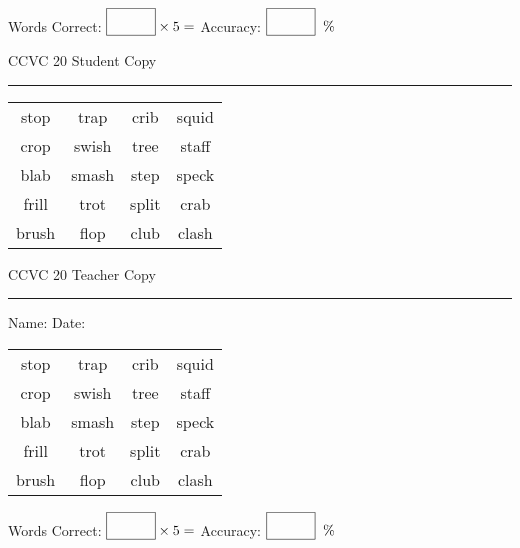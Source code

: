 \documentclass{memoir}
\begin{document}
\small

Words Correct: $\fbox{\phantom{\huge 100}} \times 5 = $ Accuracy: $\fbox{\phantom{\huge 100}}\;\; \%$ 

\vfill

\newpage



\footnotesize \noindent
CCVC 20 \hfill Student Copy
\smallskip
\hrule

\Large

\setlength{\tabcolsep}{14pt}
\def\arraystretch{3}

{\selectfont


\begin{vplace}[0.5]
\begin{center}
\begin{tabular}{cccc}
stop & trap & crib & squid \\
crop & swish & tree & staff            \\
blab             & smash & step & speck \\
frill & trot & split & crab        \\
brush & flop & club & clash            \\
\end{tabular}
\end{center}
\end{vplace}

}

\newpage

\footnotesize \noindent
CCVC 20 \hfill Teacher Copy
\smallskip
\hrule

\small

\vfill

\noindent
Name: \underline{\hspace{1.75in}} \hfill Date: \underline{\hspace{1in}}

\Large

{\selectfont


\begin{vplace}[0.5]
\begin{center}
\begin{tabular}{cccc}
stop & trap & crib & squid \\
crop & swish & tree & staff            \\
blab             & smash & step & speck \\
frill & trot & split & crab        \\
brush & flop & club & clash            \\
\end{tabular}
\end{center}
\end{vplace}



}

\small

Words Correct: $\fbox{\phantom{\huge 100}} \times 5 = $ Accuracy: $\fbox{\phantom{\huge 100}}\;\; \%$ 

\vfill

\end{document}
